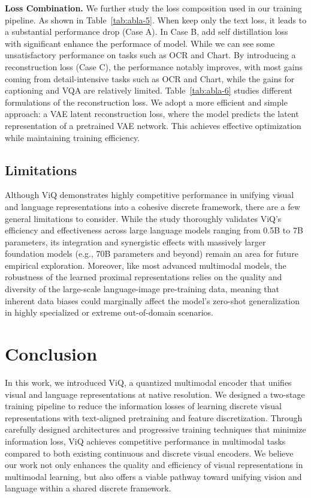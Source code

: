 \documentclass{llmxive}
\providecommand{\paragrapha}[1]{\par\addvspace{0.45em}\noindent\textbf{#1}}
\begin{document}
\paragrapha{Loss Combination. }
We further study the loss composition used in our training pipeline. As shown in Table~\ref{tab:abla-5}. When keep only the text loss, it leads to a substantial performance drop (Case A). In Case B, add self distillation loss with significant enhance the performace of model. While we can see some unsatisfactory performance on tasks such as OCR and Chart. By introducing a reconstruction loss (Case C), the performance notably improves, with most gains coming from detail-intensive tasks such as OCR and Chart, while the gains for captioning and VQA are relatively limited. Table~\ref{tab:abla-6} studies different formulations of the reconstruction loss. We adopt a more efficient and simple approach: a VAE latent reconstruction loss, where the model predicts the latent representation of a pretrained VAE network. This achieves effective optimization while maintaining training efficiency.

\subsection{Limitations}
Although ViQ demonstrates highly competitive performance in unifying visual and language representations into a cohesive discrete framework, there are a few general limitations to consider. While the study thoroughly validates ViQ's efficiency and effectiveness across large language models ranging from 0.5B to 7B parameters, its integration and synergistic effects with massively larger foundation models (e.g., 70B parameters and beyond) remain an area for future empirical exploration. Moreover, like most advanced multimodal models, the robustness of the learned proximal representations relies on the quality and diversity of the large-scale language-image pre-training data, meaning that inherent data biases could marginally affect the model's zero-shot generalization in highly specialized or extreme out-of-domain scenarios.

\section{Conclusion}
\label{sec:conclusion}

In this work, we introduced ViQ, a quantized multimodal encoder that unifies visual and language representations at native resolution. We designed a two-stage training pipeline to reduce the information losses of learning discrete visual representations with text-aligned pretraining and feature discretization. Through carefully designed architectures and progressive training techniques that minimize information loss, ViQ achieves competitive performance in multimodal tasks compared to both existing continuous and discrete visual encoders. We believe our work not only enhances the quality and efficiency of visual representations in multimodal learning, but also offers a viable pathway toward unifying vision and language within a shared discrete framework.
\end{document}
